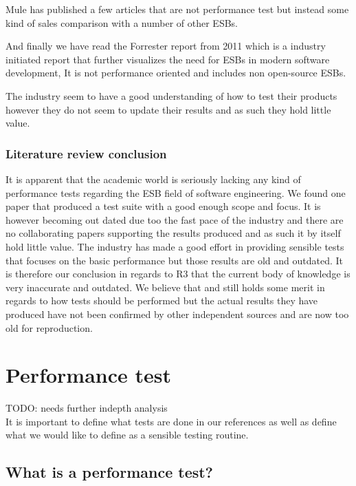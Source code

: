 \documentclass{llncs}
\begin{document}
Mule has published a few articles that are not performance test but instead some kind of sales comparison with a number of other ESBs\cite{mulevsjboss,mulevsglassfish,mulevsservicemix}.

And finally we have read the Forrester report \cite{forrester11} from 2011 which is a industry initiated report that further visualizes the need for ESBs in modern software development, It is not performance oriented and includes non open-source ESBs.

The industry seem to have a good understanding of how to test their products however they do not seem to update their results and as such they hold little value.

\subsubsection{Literature review conclusion}

It is apparent that the academic world is seriously lacking any kind of performance tests regarding the ESB field of software engineering. We found one paper\cite{Sanjay2011} that produced a test suite with a good enough scope and focus. It is however becoming out dated due too the fast pace of the industry and there are no collaborating papers supporting the results produced and as such it by itself hold little value. The industry has made a good effort in providing sensible tests that focuses on the basic performance but those results are old and outdated. 
It is therefore our conclusion in regards to R3 that the current body of knowledge is very inaccurate and outdated. We believe that \cite{Sanjay2011} and \cite{Perera07,Perera07R2,Perera07R3,mulesoft08}still holds some merit in regards to how tests should be performed but the actual results they have produced have not been confirmed by other independent sources and are now too old for reproduction.

\section{Performance test}
TODO: needs further indepth analysis \\
It is important to define what tests are done in our references as well as define what we would like to define as a sensible testing routine.
\subsection{What is a performance test?}
\end{document}
